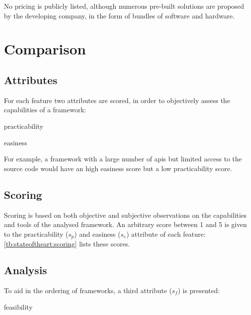 No pricing is publicly listed, although numerous pre-built solutions are proposed by the developing company, in the form of bundles of software and hardware.

\section{Comparison}\label{sc:stateoftheart:comparison}

\subsection{Attributes}

For each \gls{feature} two \glspl{attribute} are scored, in order to objectively assess the capabilities of a \gls{framework}:

\begin{definition}{practicability}
\end{definition}

\begin{definition}{easiness}
\end{definition}

For example, a framework with a large number of \glspl{api} but limited access to the source code would have an high \gls{easiness} score but a low \gls{practicability} score.

\subsection{Scoring}

Scoring is based on both objective and subjective observations on the capabilities and tools of the analysed \gls{framework}. An arbitrary score between \num{1} and \num{5} is given to the \gls{practicability} ($s_p$) and \gls{easiness} ($s_e$) \gls{attribute} of each \gls{feature}: \cref{tb:stateoftheart:scoring} lists these scores.



\subsection{Analysis}

To aid in the ordering of \glspl{framework}, a third \gls{attribute} ($s_f$) is presented:

\begin{definition}{feasibility}
\end{definition}

